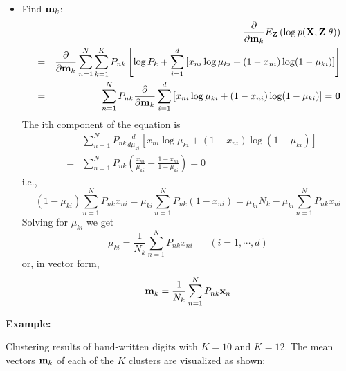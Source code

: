 \documentclass{article}
\begin{document}
\begin{itemize}
\begin{itemize}
  \item Find ${\bf m}_k$:
    \begin{eqnarray}
      && \frac{\partial}{\partial{\bf m}_k}     
      E_{\bf Z}\left( \log p({\bf X},{\bf Z}|\theta) \right)
      \nonumber\\
      &=&\frac{\partial}{\partial{\bf m}_k}     
      \sum_{n=1}^N \sum_{k=1}^K P_{nk}   \left[\log P_k
        +\sum_{i=1}^d \left[ x_{ni}\log\mu_{ki}+(1-x_{ni})\log(1-\mu_{ki}) \right]\right]
      \nonumber\\
      &=&\sum_{n=1}^N P_{nk} \frac{\partial}{\partial{\bf m}_k}
      \sum_{i=1}^d\left[ x_{ni}\log\mu_{ki}+(1-x_{ni})\log(1-\mu_{ki}) \right]={\bf 0}
    \end{eqnarray}
    The ith component of the equation is
    \begin{eqnarray}
      &&\sum_{n=1}^N P_{nk}\frac{d}{d\mu_{ki}}
      \left[ x_{ni}\log \mu_{ki}+(1-x_{ni})\log(1-\mu_{ki})\right]
      \nonumber\\
      &=&\sum_{n=1}^N P_{nk}\left(\frac{x_{ni}}{\mu_{ki}}-\frac{1-x_{ni}}{1-\mu_{ki}}\right)=0
    \end{eqnarray}
    i.e.,
    \begin{equation}
      (1-\mu_{ki})\sum_{n=1}^N P_{nk} x_{ni}=\mu_{ki}\sum_{n=1}^N P_{nk}(1-x_{ni})
      =\mu_{ki}N_k-\mu_{ki} \sum_{n=1}^N P_{nk}x_{ni}
    \end{equation}
    Solving for $\mu_{ki}$ we get
    \begin{equation}
      \mu_{ki}=\frac{1}{N_k}\sum_{n=1}^N P_{nk}x_{ni}\;\;\;\;\;\;(i=1,\cdots,d)
    \end{equation}
    or, in vector form,
    \begin{equation}
      {\bf m}_k=\frac{1}{N_k}\sum_{n=1}^N P_{nk}{\bf x}_n
    \end{equation}


  \end{itemize}

{\bf Example:}

Clustering results of hand-written digits with $K=10$ and $K=12$. The mean
vectors ${\bf m}_k$ of each of the $K$ clusters are visualized as shown:




\end{itemize}
\end{document}
